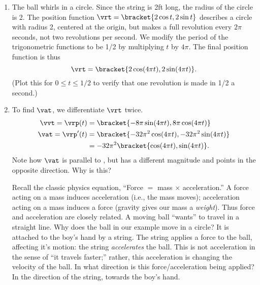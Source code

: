{\begin{enumerate}
	\item The ball whirls in a  circle. Since the string is 2ft long, the radius of the circle is 2. The position function $\vrt =\bracket{2\cos t, 2\sin t}$ describes a circle with radius 2, centered at the origin, but makes a full revolution every $2\pi$ seconds, not two revolutions per second. We modify the period of the trigonometric functions to be 1/2 by multiplying $t$ by $4\pi$. The final position function is thus \[\vrt =\bracket{2\cos (4\pi t), 2\sin (4\pi t)}.\]
	(Plot this for $0\leq t\leq 1/2$ to verify that one revolution is made in 1/2 a second.)
	
	\item		To find $\vat$, we differentiate $\vrt$ twice.
	\begin{align*}
	\vvt = \vrp(t) &=\bracket{-8\pi \sin (4\pi t), 8\pi \cos (4\pi t)}\\
	\vat =\vrp'(t) &=\bracket{-32\pi^2 \cos (4\pi t), -32\pi^2 \sin (4\pi t)}\\
				&= -32\pi^2\bracket{\cos (4\pi t), \sin (4\pi t)}.
	\end{align*}
	Note how $\vat$ is parallel to \vrt, but has a different magnitude and points in the opposite direction. Why is this?
	
	Recall the classic physics equation, ``Force $=$ mass $\times$ acceleration.'' A force acting on a mass induces acceleration (i.e., the mass moves); acceleration acting on a mass induces a force (gravity gives our mass a \emph{weight}). Thus force and acceleration are closely related. A moving ball ``wants'' to travel in a straight line. Why does the ball in our example move in a circle? It is attached to the boy's hand by a string. The string applies a force to the ball, affecting it's motion: the string \emph{accelerates} the ball. This is not acceleration in the sense of ``it travels faster;'' rather, this acceleration is changing the velocity of the ball. In what direction is this force/acceleration being applied? In the direction of the string, towards the boy's hand.
	

\end{enumerate}}
